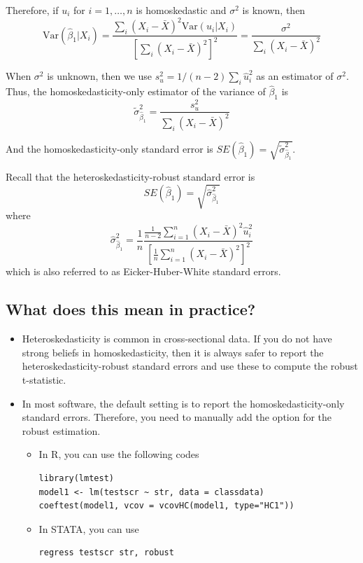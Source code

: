 \documentclass[a4paper,11pt]{article}
\newcommand{\var}{\mathrm{Var}}
\begin{document}
Therefore, if \(u_i\) for \(i=1, \ldots, n\) is
homoskedastic and \(\sigma^2\) is known, then
\begin{equation}
\label{eq:vbeta-1a} \var(\hat{\beta}_1 | X_i) = \frac{\sum_i (X_i -
\bar{X})^2 \var(u_i|X_i)}{\left[\sum_i (X_i - \bar{X})^2\right]^2} =
\frac{\sigma^2}{\sum_i (X_i - \bar{X})^2}
\end{equation}

When \(\sigma^2\) is unknown, then we use \(s^2_u = 1/(n-2) \sum_i
\hat{u}_i^2\) as an estimator of \(\sigma^2\). Thus, the
homoskedasticity-only estimator of the variance of \(\hat{\beta}_1\) is
\begin{equation}
\label{eq:vbeta-1b} \tilde{\sigma}^2_{\hat{\beta}_1} =
\frac{s^2_u}{\sum_i (X_i - \bar{X})^2}
\end{equation}

And the homoskedasticity-only standard error is \(SE(\hat{\beta}_1) =
\sqrt{\tilde{\sigma}^2_{\hat{\beta}_1}}\).

Recall that the heteroskedasticity-robust standard error is
\begin{equation*}
SE(\hat{\beta}_1) = \sqrt{\hat{\sigma}^2_{\hat{\beta}_1}}
\end{equation*}
where
\begin{equation*}
\hat{\sigma}^2_{\hat{\beta}_1} = \frac{1}{n} \frac{\frac{1}{n-2}
\sum_{i=1}^n (X_i - \bar{X})^2 \hat{u}^2_i}{\left[ \frac{1}{n}
\sum_{i=1}^n (X_i - \bar{X})^2 \right]^2}
\end{equation*}
which is also referred to as Eicker-Huber-White standard errors.


\subsection{What does this mean in practice?}
\label{sec:org97aceb1}

\begin{itemize}
\item Heteroskedasticity is common in cross-sectional data. If you do not
have strong beliefs in homoskedasticity, then it is always safer to
report the heteroskedasticity-robust standard errors and use these
to compute the robust t-statistic.
\item In most software, the default setting is to report the
homoskedasticity-only standard errors. Therefore, you need to
manually add the option for the robust estimation.

\begin{itemize}
\item In R, you can use the following codes
\begin{verbatim}
library(lmtest)
model1 <- lm(testscr ~ str, data = classdata)
coeftest(model1, vcov = vcovHC(model1, type="HC1"))
\end{verbatim}

\item In STATA, you can use
\begin{verbatim}
regress testscr str, robust
\end{verbatim}
\end{itemize}
\end{itemize}
\end{document}
